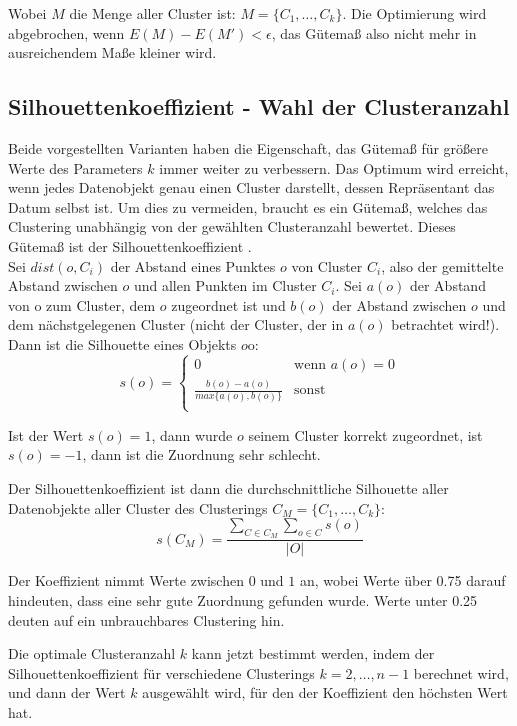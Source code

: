 \documentclass[11pt,ceqn]{book}
\begin{document}
Wobei $M$ die Menge aller Cluster ist: $M = \{C_1, \dots, C_k\}$. Die Optimierung wird abgebrochen, wenn $E(M)-E(M')<\epsilon$, das Gütemaß also nicht mehr in ausreichendem Maße kleiner wird.

\subsection{Silhouettenkoeffizient - Wahl der Clusteranzahl}
Beide vorgestellten Varianten haben die Eigenschaft, das Gütemaß für größere Werte des Parameters $k$ immer weiter zu verbessern. Das Optimum wird erreicht, wenn jedes Datenobjekt genau einen Cluster darstellt, dessen Repräsentant das Datum selbst ist. Um dies zu vermeiden, braucht es ein Gütemaß, welches das Clustering unabhängig von der gewählten Clusteranzahl bewertet. Dieses Gütemaß ist der Silhouettenkoeffizient \cite{silh}.\\
Sei $dist(o,C_i)$ der Abstand eines Punktes $o$ von Cluster $C_i$, also der gemittelte Abstand zwischen $o$ und allen Punkten im Cluster $C_i$. Sei $a(o)$ der Abstand von o zum Cluster, dem $o$ zugeordnet ist und $b(o)$ der Abstand zwischen $o$ und dem nächstgelegenen Cluster (nicht der Cluster, der in $a(o)$ betrachtet wird!).
Dann ist die Silhouette eines Objekts $o$o:
\begin{equation}
   s(o) =
   \begin{cases}
     0 & \text{wenn } a(o) = 0\\
     \frac{b(o) - a(o)}{max\{a(o), b(o)\}} & \text{sonst} \\
   \end{cases}
\end{equation}

Ist der Wert $s(o) = 1$, dann wurde $o$ seinem Cluster korrekt zugeordnet, ist $s(o) = -1$, dann ist die Zuordnung sehr schlecht.

Der Silhouettenkoeffizient ist dann die durchschnittliche Silhouette aller Datenobjekte aller Cluster des Clusterings $C_M = \{C_1, \dots, C_k\}$:
$$s(C_M) = \frac{\sum\limits_{C \in C_M} \sum\limits_{o \in C} s(o)} {|O|}$$

Der Koeffizient nimmt Werte zwischen $0$ und $1$ an, wobei Werte über 0.75 darauf hindeuten, dass eine sehr gute Zuordnung gefunden wurde. Werte unter 0.25 deuten auf ein unbrauchbares Clustering hin.

Die optimale Clusteranzahl $k$ kann jetzt bestimmt werden, indem der Silhouettenkoeffizient für verschiedene Clusterings $k = 2, \dots, n-1$ berechnet wird, und dann der Wert $k$ ausgewählt wird, für den der Koeffizient den höchsten Wert hat.
\end{document}
